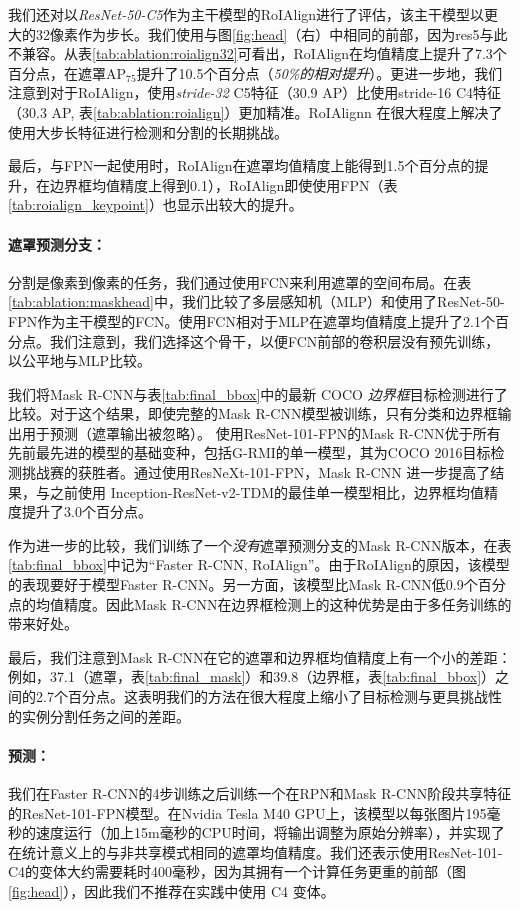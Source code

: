 我们还对以\emph{ResNet-50-C5}作为主干模型的RoIAlign进行了评估，该主干模型以更大的32像素作为步长。我们使用与图\ref{fig:head}（右）中相同的前部，因为res5与此不兼容。从表\ref{tab:ablation:roialign32}可看出，RoIAlign在均值精度上提升了7.3个百分点，在遮罩AP$_{75}$提升了10.5个百分点（\emph{50\%的相对提升}）。更进一步地，我们注意到对于RoIAlign，使用\emph{stride-32} C5特征（30.9 AP）比使用stride-16 C4特征（30.3 AP, 表\ref{tab:ablation:roialign}）更加精准。RoIAlignn 在很大程度上解决了使用大步长特征进行检测和分割的长期挑战。

最后，与FPN一起使用时，RoIAlign在遮罩均值精度上能得到1.5个百分点的提升，在边界框均值精度上得到0.1），RoIAlign即使使用FPN（表\ref{tab:roialign_keypoint}）也显示出较大的提升。

\paragraph{遮罩预测分支：} 分割是像素到像素的任务，我们通过使用FCN来利用遮罩的空间布局。在表\ref{tab:ablation:maskhead}中，我们比较了多层感知机（MLP）和使用了ResNet-50-FPN作为主干模型的FCN。使用FCN相对于MLP在遮罩均值精度上提升了2.1个百分点。我们注意到，我们选择这个骨干，以便FCN前部的卷积层没有预先训练，以公平地与MLP比较。


我们将Mask R-CNN与表\ref{tab:final_bbox}中的最新 COCO \emph{边界框}目标检测进行了比较。对于这个结果，即使完整的Mask R-CNN模型被训练，只有分类和边界框输出用于预测（遮罩输出被忽略）。 使用ResNet-101-FPN的Mask R-CNN优于所有先前最先进的模型的基础变种，包括G-RMI的单一模型，其为COCO 2016目标检测挑战赛的获胜者。通过使用ResNeXt-101-FPN，Mask R-CNN 进一步提高了结果，与之前使用 Inception-ResNet-v2-TDM的最佳单一模型相比，边界框均值精度提升了3.0个百分点。

作为进一步的比较，我们训练了一个\emph{没有}遮罩预测分支的Mask R-CNN版本，在表\ref{tab:final_bbox}中记为``Faster R-CNN, RoIAlign''。由于RoIAlign的原因，该模型的表现要好于模型Faster R-CNN。另一方面，该模型比Mask R-CNN低0.9个百分点的均值精度。因此Mask R-CNN在边界框检测上的这种优势是由于多任务训练的带来好处。

最后，我们注意到Mask R-CNN在它的遮罩和边界框均值精度上有一个小的差距：例如，37.1（遮罩，表\ref{tab:final_mask}）和39.8（边界框，表\ref{tab:final_bbox}）之间的2.7个百分点。这表明我们的方法在很大程度上缩小了目标检测与更具挑战性的实例分割任务之间的差距。


\paragraph{预测：} 我们在Faster R-CNN的4步训练之后训练一个在RPN和Mask R-CNN阶段共享特征的ResNet-101-FPN模型。在Nvidia Tesla M40 GPU上，该模型以每张图片195毫秒的速度运行（加上15m毫秒的CPU时间，将输出调整为原始分辨率），并实现了在统计意义上的与非共享模式相同的遮罩均值精度。我们还表示使用ResNet-101-C4的变体大约需要耗时400毫秒，因为其拥有一个计算任务更重的前部（图\ref{fig:head}），因此我们不推荐在实践中使用 C4 变体。

